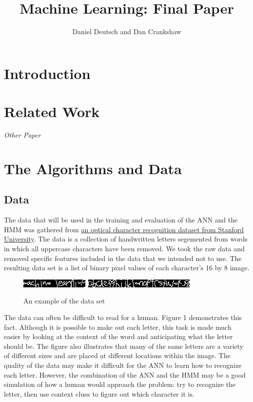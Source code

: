 \documentclass[11pt,a4paper,twocolumn]{article}
\author{Daniel Deutsch and Dan Crankshaw}
\title{Machine Learning: Final Paper}
\date{}
\begin{document}
\maketitle

\section{Introduction}

\section{Related Work}

\emph{Other Paper} \cite{feng2008hidden}

\section{The Algorithms and Data}

\subsection*{Data}

The data that will be used in the training and evaluation of the ANN and the HMM was gathered from
\href{http://ai.stanford.edu/~btaskar/ocr/}{an optical character recognition dataset from Stanford University}. The data is a collection of handwritten letters segemented from words in which all uppercase characters have been removed. We took the raw data and removed specific features included in the data that we intended not to use. The resulting data set is a list of binary pixel values of each character's 16 by 8 image.
\begin{figure}[h]
\centering
\includegraphics{img/ml.jpg}
\includegraphics{img/alphabet.jpg}
\caption{An example of the data set}
\end{figure}

The data can often be difficult to read for a human. Figure 1 demonstrates this fact. Although it is possible to make out each letter, this task is made much easier by looking at the context of the word and anticipating what the letter should be. The figure also illustrates that many of the same letters are a variety of different sizes and are placed at different locations within the image. The quality of the data may make it difficult for the ANN to learn how to recognize each letter. However, the combination of the ANN and the HMM may be a good simulation of how a human would approach the problem: try to recognize the letter, then use context clues to figure out which character it is.
\end{document}
